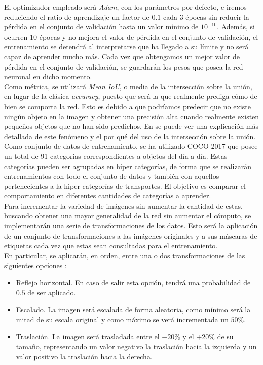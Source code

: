 El optimizador empleado será \emph{Adam}, con los parámetros por defecto, e iremos reduciendo el ratio de aprendizaje un factor de $0.1$ cada $3$ épocas sin reducir la pérdida en el conjunto de validación hasta un valor mínimo de $10^{-10}$. Además, si ocurren $10$ épocas y no mejora el valor de pérdida en el conjunto de validación, el entrenamiento se detendrá al interpretarse que ha llegado a su límite y no será capaz de aprender mucho más. Cada vez que obtengamos un mejor valor de pérdida en el conjunto de validación, se guardarán los pesos que posea la red neuronal en dicho momento.\\

Como métrica, se utilizará \emph{Mean IoU}, o media de la intersección sobre la unión, en lugar de la clásica \emph{accuracy}, puesto que será la que realmente prediga cómo de bien se comporta la red. Esto es debido a que podríamos predecir que no existe ningún objeto en la imagen y obtener una precisión alta cuando realmente existen pequeños objetos que no han sido predichos. En \cite{accvsiou} se puede ver una explicación más detallada de este fenómeno y el por qué del uso de la intersección sobre la unión. \\

Como conjunto de datos de entrenamiento, se ha utilizado COCO 2017 \cite{2014arXiv1405.0312L} \cite{COCO} que posee un total de 91 categorías correspondientes a objetos del día a día. Estas categorías pueden ser agrupadas en hiper categorías, de forma que se realizarán entrenamientos con todo el conjunto de datos y también con aquellos pertenecientes a la hiper categorías de transportes. El objetivo es comparar el comportamiento en diferentes cantidades de categorías a aprender.\\

Para incrementar la variedad de imágenes sin aumentar la cantidad de estas, buscando obtener una mayor generalidad de la red sin aumentar el cómputo, se implementarán una serie de transformaciones de los datos. Esto será la aplicación de un conjunto de transformaciones a las imágenes originales y a sus máscaras de etiquetas cada vez que estas sean consultadas para el entrenamiento. \\

\newpage
En particular, se aplicarán, en orden, entre una o dos transformaciones de las siguientes opciones \cite{imgaug}: \\
\begin{itemize}
\item Reflejo horizontal. En caso  de salir esta opción, tendrá una probabilidad de $0.5$ de ser aplicado.
\item Escalado. La imagen será escalada de forma aleatoria, como mínimo será la mitad de su escala original y como máximo se verá incrementada un $50\%$.
\item Traslación. La imagen será trasladada entre el $-20\%$ y el $+20\%$ de su tamaño, representando un valor negativo la traslación hacia la izquierda y un valor positivo la traslación hacia la derecha.
\end{itemize}

